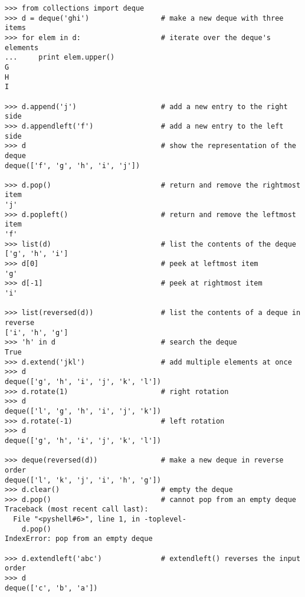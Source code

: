 \begin{verbatim}
>>> from collections import deque
>>> d = deque('ghi')                 # make a new deque with three items
>>> for elem in d:                   # iterate over the deque's elements
...     print elem.upper()	
G
H
I

>>> d.append('j')                    # add a new entry to the right side
>>> d.appendleft('f')                # add a new entry to the left side
>>> d                                # show the representation of the deque
deque(['f', 'g', 'h', 'i', 'j'])

>>> d.pop()                          # return and remove the rightmost item
'j'
>>> d.popleft()                      # return and remove the leftmost item
'f'
>>> list(d)                          # list the contents of the deque
['g', 'h', 'i']
>>> d[0]                             # peek at leftmost item
'g'
>>> d[-1]                            # peek at rightmost item
'i'

>>> list(reversed(d))                # list the contents of a deque in reverse
['i', 'h', 'g']
>>> 'h' in d                         # search the deque
True
>>> d.extend('jkl')                  # add multiple elements at once
>>> d
deque(['g', 'h', 'i', 'j', 'k', 'l'])
>>> d.rotate(1)                      # right rotation
>>> d
deque(['l', 'g', 'h', 'i', 'j', 'k'])
>>> d.rotate(-1)                     # left rotation
>>> d
deque(['g', 'h', 'i', 'j', 'k', 'l'])

>>> deque(reversed(d))               # make a new deque in reverse order
deque(['l', 'k', 'j', 'i', 'h', 'g'])
>>> d.clear()                        # empty the deque
>>> d.pop()                          # cannot pop from an empty deque
Traceback (most recent call last):
  File "<pyshell#6>", line 1, in -toplevel-
    d.pop()
IndexError: pop from an empty deque

>>> d.extendleft('abc')              # extendleft() reverses the input order
>>> d
deque(['c', 'b', 'a'])

\end{verbatim}    
